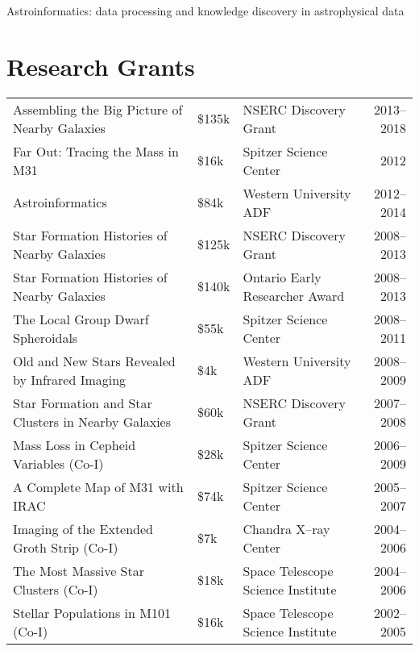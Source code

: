 \documentclass[12pt]{article}
\begin{document}
Astroinformatics: data processing and knowledge discovery in astrophysical data


\section{Research Grants}

\begin{tabularx}{\textwidth}{Xlp{5cm}r}

Assembling the Big Picture of Nearby Galaxies & \$135k & NSERC Discovery Grant & 2013--2018 \\ 

Far Out: Tracing the Mass in M31& \$16k& Spitzer Science Center & 2012\\ 

Astroinformatics & \$84k& Western University ADF& 2012--2014\\ 

 Star Formation Histories of Nearby Galaxies & \$125k& NSERC Discovery Grant & 2008--2013\\ 

Star Formation Histories of Nearby Galaxies & \$140k& Ontario Early Researcher Award& 2008--2013\\ 

 The Local Group Dwarf Spheroidals & \$55k& Spitzer Science Center & 2008--2011\\ 

Old and New Stars Revealed by Infrared Imaging & \$4k& Western University ADF  & 2008--2009\\

Star Formation and Star Clusters in Nearby Galaxies & \$60k& NSERC Discovery Grant&2007--2008\\  %

Mass Loss in Cepheid Variables (Co-I)& \$28k& Spitzer Science Center & 2006--2009\\ 

 A Complete Map of M31 with IRAC & \$74k& Spitzer Science Center & 2005--2007\\

Imaging of the Extended Groth Strip (Co-I)& \$7k& Chandra X--ray Center& 2004--2006\\ 

The Most Massive Star Clusters (Co-I)& \$18k & Space Telescope Science Institute& 2004--2006\\ 

Stellar Populations in M101 (Co-I)& \$16k & Space Telescope Science Institute& 2002--2005\\ 
\end{tabularx}
\end{document}
